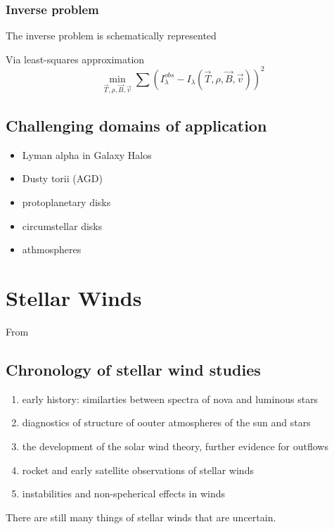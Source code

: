 \documentclass[../main/main.tex]{subfiles}
\begin{document}
\noindent{}

\subsubsection*{Inverse problem}
The inverse problem is schematically represented
\begin{center}
\end{center}
Via least-squares approximation
\begin{equation}
\min_{\vec{T},\rho,\vec{B},\vec{v}} \sum \left( I_{\lambda}^{obs} - I_\lambda(\vec{T},\rho,\vec{B},\vec{v}) \right)^2
\end{equation}

\subsection{Challenging domains of application}
\begin{itemize}
\item Lyman alpha in Galaxy Halos
\item Dusty torii (AGD)
\item protoplanetary disks
\item circumstellar disks
\item athmospheres
\end{itemize}


\section{Stellar Winds}
From \cite{introStellarWindsLamersCassinelli1999}

\subsection{Chronology of stellar wind studies}
\begin{enumerate}
\item early history: similarties between spectra of nova and luminous stars
\item diagnostics of structure of oouter atmospheres of the sun and stars
\item the development of the solar wind theory, further evidence for outflows
\item rocket and early satellite observations of stellar winds
\item instabilities and non-speherical effects in winds
\end{enumerate}
There are still many things of stellar winds that are uncertain.
\end{document}
